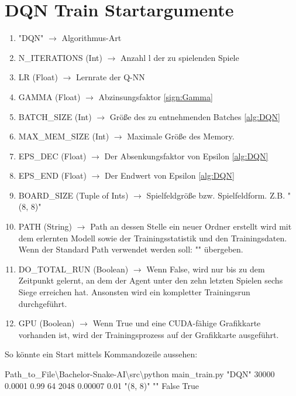 \section{DQN Train Startargumente}
\begin{enumerate}
	\item "DQN" $\longrightarrow$ Algorithmus-Art
	\item N\_ITERATIONS (Int) $\longrightarrow$ Anzahl l der zu spielenden Spiele
	\item LR (Float) $\longrightarrow$ Lernrate der Q-NN
	\item GAMMA (Float) $\longrightarrow$ Abzinsungsfaktor \ref{sign:Gamma}
	\item BATCH\_SIZE (Int) $\longrightarrow$ Größe des zu entnehmenden Batches \ref{alg:DQN}
	\item MAX\_MEM\_SIZE (Int) $\longrightarrow$ Maximale Größe des Memory.
	\item EPS\_DEC (Float) $\longrightarrow$ Der Absenkungsfaktor von Epsilon \ref{alg:DQN}
	\item EPS\_END (Float) $\longrightarrow$ Der Endwert von Epsilon \ref{alg:DQN}
	\item BOARD\_SIZE (Tuple of Ints) $\longrightarrow$ Spielfeldgröße bzw. Spielfeldform. Z.B. "(8, 8)"
	\item PATH (String) $\longrightarrow$ Path an dessen Stelle ein neuer Ordner erstellt wird mit dem erlernten Modell sowie der Trainingsstatistik und den Trainingsdaten. Wenn der Standard Path verwendet werden soll: "" übergeben.
	\item DO\_TOTAL\_RUN (Boolean) $\longrightarrow$ Wenn False, wird nur bis zu dem Zeitpunkt gelernt, an dem der Agent unter den zehn letzten Spielen sechs Siege erreichen hat. Ansonsten wird ein kompletter Trainingsrun durchgeführt.
	\item GPU (Boolean) $\longrightarrow$ Wenn True und eine CUDA-fähige Grafikkarte vorhanden ist, wird der Trainingsprozess auf der Grafikkarte ausgeführt.
\end{enumerate}
So könnte ein Start mittels Kommandozeile aussehen:
\begin{center}
	Path\_to\_File\textbackslash Bachelor-Snake-AI\textbackslash src\textbackslash python main\_train.py "DQN"{} 30000 0.0001 0.99 64 2048 0.00007 0.01 "(8, 8)"{} ""{} False True
\end{center}

